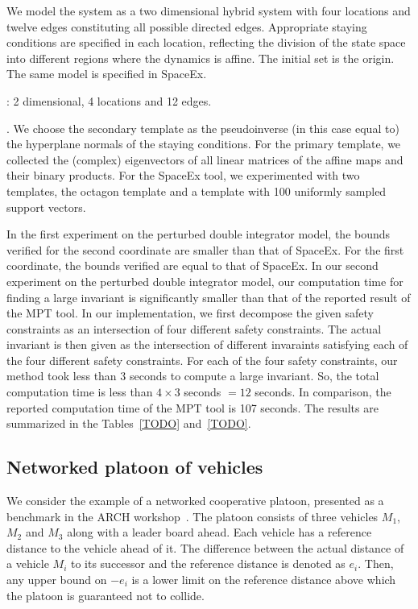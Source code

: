   We model the system as a two dimensional hybrid
system with four locations and twelve edges constituting all possible
directed edges.  Appropriate staying conditions are specified in each
location, reflecting the division of the state space into different
regions where the dynamics is affine.  The initial set is the origin.
The same model is specified in SpaceEx.

: 2 dimensional, 4 locations and 12 edges.

.  We choose the secondary template as
the pseudoinverse (in this case equal to) the hyperplane normals of
the staying conditions.  For the primary template, we collected the
(complex) eigenvectors of all linear matrices of the affine maps and their
binary products. For the SpaceEx tool, we experimented with two
templates, the octagon template and a template with 100 uniformly
sampled support vectors.

  In the first experiment on the perturbed double
integrator model, the bounds verified for the second coordinate are
smaller than that of SpaceEx.  For the first coordinate, the bounds
verified are equal to that of SpaceEx.  In our second experiment on
the perturbed double integrator model, our computation time for
finding a large invariant is significantly smaller than that of the
reported result of the MPT tool.  In our implementation, we first
decompose the given safety constraints as an intersection of four
different safety constraints.  The actual invariant is then given as
the intersection of different invaraints satisfying each of the four
different safety constraints.  For each of the four safety
constraints, our method took less than $3$ seconds to compute a large
invariant.  So, the total computation time is less than $4\times 3$
seconds $=12$ seconds.  In comparison, the reported computation time
of the MPT tool is 107 seconds.  The results are summarized in the
Tables~\ref{TODO} and~\ref{TODO}.



\subsection{Networked platoon of vehicles}
We consider the example of a networked cooperative platoon, presented
as a benchmark in the ARCH workshop~\cite{TODO}.  The platoon consists
of three vehicles $M_1$, $M_2$ and $M_3$ along with a leader board
ahead.  Each vehicle has a reference distance to the vehicle ahead of
it.  The difference between the actual distance of a vehicle $M_i$ to
its successor and the reference distance is denoted as $e_i$.  Then, any
upper bound on $-e_i$ is a lower limit on the reference distance
above which the platoon is guaranteed not to collide.

